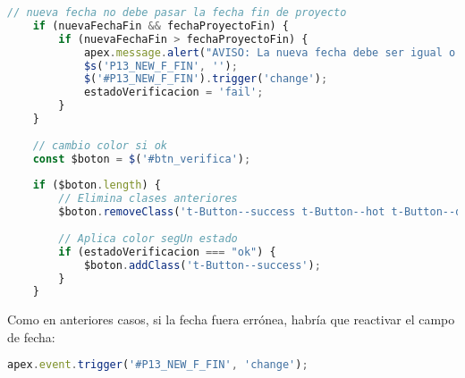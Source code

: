 \begin{lstlisting}[language=JavaScript, caption={Verifica la fecha de renovación se posterior a la actual y anterior a fin proyecto}]
	// nueva fecha no debe pasar la fecha fin de proyecto
	if (nuevaFechaFin && fechaProyectoFin) {
		if (nuevaFechaFin > fechaProyectoFin) {
			apex.message.alert("AVISO: La nueva fecha debe ser igual o anterior a: " + fechaProyectoFin.toLocaleDateString('es-ES'));
			$s('P13_NEW_F_FIN', '');
			$('#P13_NEW_F_FIN').trigger('change');
			estadoVerificacion = 'fail';
		}
	}
	
	// cambio color si ok
	const $boton = $('#btn_verifica');
	
	if ($boton.length) {
		// Elimina clases anteriores
		$boton.removeClass('t-Button--success t-Button--hot t-Button--danger');
		
		// Aplica color segUn estado
		if (estadoVerificacion === "ok") {
			$boton.addClass('t-Button--success');
		}
	}
\end{lstlisting}

Como en anteriores casos, si la fecha fuera errónea, habría que reactivar el campo de fecha:
\begin{lstlisting}[language=JavaScript, caption={Reactiva fecha renovación se es errónea}]
	apex.event.trigger('#P13_NEW_F_FIN', 'change');
\end{lstlisting}

